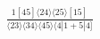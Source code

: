 \documentclass[varwidth, border=5pt]{standalone}
\begin{document}
\begin{my}
$\begin{gathered}
\scriptscriptstyle\frac{1[45]⟨24⟩⟨25⟩[15]}{⟨23⟩⟨34⟩⟨45⟩⟨4|1+5|4]}
\end{gathered}$
\end{my}
\end{document}
